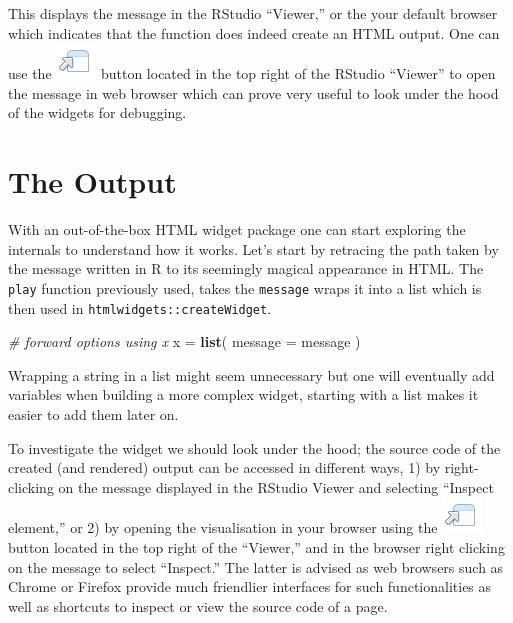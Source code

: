 \documentclass[
]{krantz}
\makeatletter
\newenvironment{Shaded}{\begin{snugshade}}{\end{snugshade}}
\newcommand{\CommentTok}[1]{\textcolor[rgb]{0.37,0.37,0.37}{\textit{#1}}}
\newcommand{\DataTypeTok}[1]{\textcolor[rgb]{0.27,0.27,0.27}{#1}}
\newcommand{\KeywordTok}[1]{\textcolor[rgb]{0.27,0.27,0.27}{\textbf{#1}}}
\newcommand{\NormalTok}[1]{#1}
\newcommand{\StringTok}[1]{\textcolor[rgb]{0.5,0.5,0.5}{#1}}
\newenvironment{kframe}{%
\medskip{}
\setlength{\fboxsep}{.8em}
 \def\at@end@of@kframe{}%
 \ifinner\ifhmode%
  \def\at@end@of@kframe{\end{minipage}}%
  \begin{minipage}{\columnwidth}%
 \fi\fi%
 \def\FrameCommand##1{\hskip\@totalleftmargin \hskip-\fboxsep
 \colorbox{shadecolor}{##1}\hskip-\fboxsep
     \hskip-\linewidth \hskip-\@totalleftmargin \hskip\columnwidth}%
 \MakeFramed {\advance\hsize-\width
   \@totalleftmargin\z@ \linewidth\hsize
   \@setminipage}}%
 {\par\unskip\endMakeFramed%
 \at@end@of@kframe}
\renewenvironment{Shaded}{\begin{kframe}}{\end{kframe}}
\makeatother
\begin{document}
This displays the message in the RStudio ``Viewer,'' or the your default browser which indicates that the function does indeed create an HTML output. One can use the \includegraphics{images/open-in-browser.png} button located in the top right of the RStudio ``Viewer'' to open the message in web browser which can prove very useful to look under the hood of the widgets for debugging.

\hypertarget{the-output}{%
\section*{The Output}\label{the-output}}


With an out-of-the-box HTML widget package one can start exploring the internals to understand how it works. Let's start by retracing the path taken by the message written in R to its seemingly magical appearance in HTML. The \texttt{play} function previously used, takes the \texttt{message} wraps it into a list which is then used in \texttt{htmlwidgets::createWidget}.

\begin{Shaded}
\begin{Highlighting}[]
\CommentTok{\# forward options using x}
\NormalTok{x =}\StringTok{ }\KeywordTok{list}\NormalTok{(}
  \DataTypeTok{message =}\NormalTok{ message}
\NormalTok{)}
\end{Highlighting}
\end{Shaded}

Wrapping a string in a list might seem unnecessary but one will eventually add variables when building a more complex widget, starting with a list makes it easier to add them later on.

To investigate the widget we should look under the hood; the source code of the created (and rendered) output can be accessed in different ways, 1) by right-clicking on the message displayed in the RStudio Viewer and selecting ``Inspect element,'' or 2) by opening the visualisation in your browser using the \includegraphics{images/open-in-browser.png} button located in the top right of the ``Viewer,'' and in the browser right clicking on the message to select ``Inspect.'' The latter is advised as web browsers such as Chrome or Firefox provide much friendlier interfaces for such functionalities as well as shortcuts to inspect or view the source code of a page.
\end{document}
